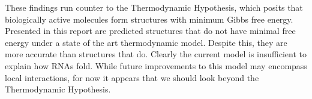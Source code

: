 \documentclass{cshonours}
\begin{document}
These findings run counter to the Thermodynamic Hypothesis, which posits that biologically active molecules form structures with minimum Gibbs free energy. Presented in this report are predicted structures that do not have minimal free energy under a state of the art thermodynamic model. Despite this, they are more accurate than structures that do. Clearly the current model is insufficient to explain how RNAs fold. While future improvements to this model may encompass local interactions, for now it appears that we should look beyond the Thermodynamic Hypothesis.






\end{document}
